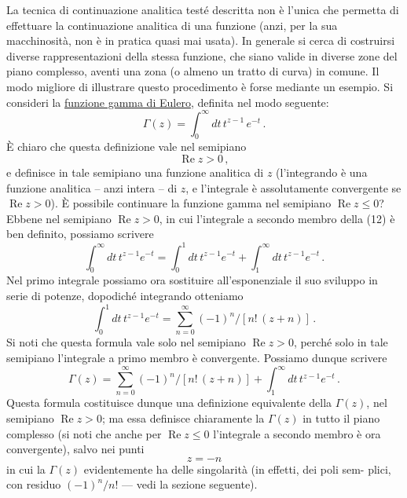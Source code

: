 \documentclass[11pt, a4paper]{book}
\numberwithin{equation}{section}
\begin{document}
La tecnica di continuazione analitica testé descritta non è l'unica che permetta di effettuare la continuazione analitica di una funzione (anzi, per la sua macchinosità, non è in pratica quasi mai usata). In generale si cerca di costruirsi diverse rappresentazioni della stessa funzione, che siano valide in diverse zone del piano complesso, aventi una zona (o almeno un tratto di curva) in comune. Il modo migliore di illustrare questo procedimento è forse mediante un esempio. Si consideri la \uline{funzione gamma di Eulero}, definita nel modo seguente:
\begin{equation}
\Gamma(z) = \int_0^{\infty} dt\, t^{z-1}\, e^{-t}\,. \tag{12}
\end{equation}
È chiaro che questa definizione vale nel semipiano
\begin{equation}
\operatorname{Re} z > 0\,, \tag{13}
\end{equation}
e definisce in tale semipiano una funzione analitica di $z$ (l'integrando è una funzione analitica -- anzi intera -- di $z$, e l'integrale è assolutamente convergente se $\operatorname{Re} z > 0$). È possibile continuare la funzione gamma nel semipiano $\operatorname{Re} z \leq 0$? Ebbene nel semipiano $\operatorname{Re} z > 0$, in cui l'integrale a secondo membro della (12) è ben definito, possiamo scrivere
\begin{equation}
\int_0^{\infty} dt\, t^{z-1} e^{-t} = \int_0^{1} dt\, t^{z-1} e^{-t} + \int_1^{\infty} dt\, t^{z-1} e^{-t}\,. \tag{14}
\end{equation}
Nel primo integrale possiamo ora sostituire all'esponenziale il suo sviluppo in serie di potenze, dopodiché integrando otteniamo
\[
\int_0^1 dt\, t^{z-1} e^{-t} = \sum_{n=0}^{\infty} (-1)^n / \left[n!\,(z+n)\right]\,.
\]
Si noti che questa formula vale solo nel semipiano $\operatorname{Re} z > 0$, perché solo in tale semipiano l'integrale a primo membro è convergente. Possiamo dunque scrivere
\begin{equation}
\Gamma(z) = \sum_{n=0}^{\infty} (-1)^n/\left[n!\,(z+n)\right] + \int_1^{\infty} dt\, t^{z-1} e^{-t}\,. \tag{15}
\end{equation}
Questa formula costituisce dunque una definizione equivalente della $\Gamma(z)$, nel semipiano $\operatorname{Re} z > 0$; ma essa definisce chiaramente la $\Gamma(z)$ in tutto il piano complesso (si noti che anche per $\operatorname{Re} z \leq 0$ l'integrale a secondo membro è ora convergente), salvo nei punti
\begin{equation}
z = -n \tag{16}
\end{equation}
in cui la $\Gamma(z)$ evidentemente ha delle singolarità (in effetti, dei poli sem-%
plici, con residuo $(-1)^n/n!$ — vedi la sezione seguente).
\end{document}
